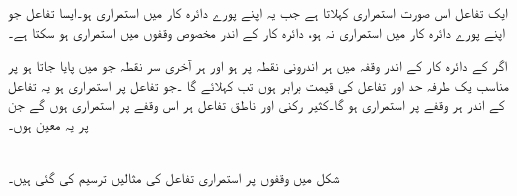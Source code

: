 ایک تفاعل  اس صورت استمراری کہلاتا ہے جب یہ اپنے پورے دائرہ کار میں استمراری ہو۔ایسا تفاعل جو اپنے پورے دائرہ کار میں استمراری نہ ہو، دائرہ کار کے اندر مخصوص وقفوں میں استمراری ہو سکتا ہے۔
 
اگر  کے دائرہ کار کے اندر  وقفہ  میں  ہر اندرونی نقطہ  پر  ہو اور ہر آخری سر نقطہ جو  میں پایا جاتا ہو پر مناسب یک طرفہ حد اور تفاعل کی قیمت برابر ہوں تب    کہلائے گا ۔جو تفاعل  پر استمراری ہو یہ تفاعل  کے اندر ہر وقفے پر استمراری ہو گا۔کثیر رکنی اور ناطق تفاعل ہر اس وقفے پر استمراری ہوں گے جن پر یہ معین ہوں۔


\\
شکل  میں وقفوں پر  استمراری تفاعل کی مثالیں ترسیم کی گئی ہیں۔ 

